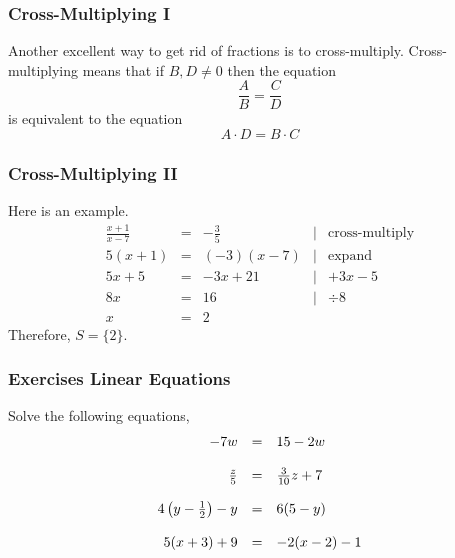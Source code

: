 \documentclass[xcolor=dvipsnames]{beamer}
\begin{document}
\begin{frame}
  \frametitle{Cross-Multiplying I}
Another excellent way to get rid of fractions is to cross-multiply.
Cross-multiplying means that if $B,D\neq{}0$ then the equation
\begin{equation}
  \label{eq:queighaw}
  \frac{A}{B}=\frac{C}{D}
\end{equation}
is equivalent to the equation
\begin{equation}
  \label{eq:maipahlu}
  A\cdot{}D=B\cdot{}C
\end{equation}
\end{frame}

\begin{frame}
  \frametitle{Cross-Multiplying II}
Here is an example.
\begin{equation}
  \label{eq:oucaedoo}
  \begin{array}{rclcl}
    \frac{x+1}{x-7}&=&-\frac{3}{5}&|&\mbox{cross-multiply} \\
    5(x+1)&=&(-3)(x-7)&|&\mbox{expand} \\
    5x+5&=&-3x+21&|&+3x-5 \\
    8x&=&16&|&\div{}8 \\
    x&=&2&&
  \end{array}
\end{equation}
Therefore, $S=\{2\}$.
\end{frame}

\begin{frame}
  \frametitle{Exercises Linear Equations}
{\ubung} Solve the following equations,
\begin{equation}
  \label{eq:b1}
  \begin{array}{rcl}
    -7w&=&15-2w \\ 
    \hspace{.5in} && \\
    \frac{z}{5}&=&\frac{3}{10}z+7 \\ 
    \hspace{.5in} && \\
    4\left(y-\frac{1}{2}\right)-y&=&6(5-y) \\ 
    \hspace{.5in} && \\
    5(x+3)+9&=&-2(x-2)-1
  \end{array}
\end{equation}
\end{frame}
\end{document}

